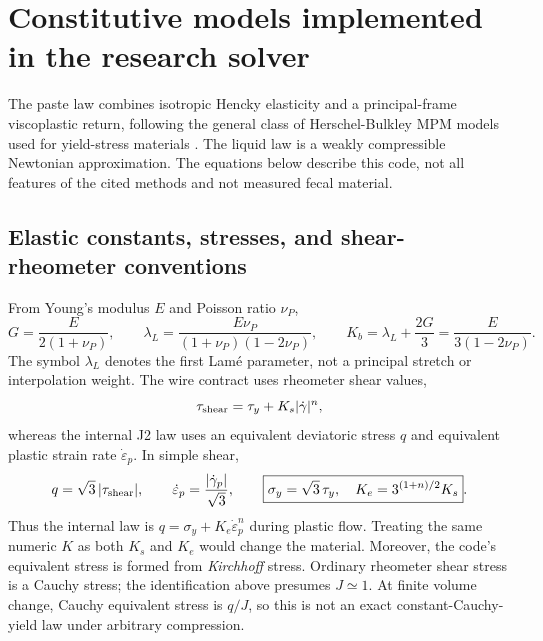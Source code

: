 \section{Constitutive models implemented in the research solver}
\label{sec:constitutive}
The paste law combines isotropic Hencky elasticity and a principal-frame
viscoplastic return, following the general class of Herschel-Bulkley MPM models
used for yield-stress materials \cite{foam}. The liquid law is a weakly
compressible Newtonian approximation. The equations below describe this code,
not all features of the cited methods and not measured fecal material.

\subsection{Elastic constants, stresses, and shear-rheometer conventions}
From Young's modulus $E$ and Poisson ratio $\nu_P$,
\begin{equation}
 G=\frac{E}{2(1+\nu_P)},\qquad
 \lambda_L=\frac{E\nu_P}{(1+\nu_P)(1-2\nu_P)},\qquad
 K_b=\lambda_L+\frac{2G}{3}=\frac{E}{3(1-2\nu_P)}.
 \label{eq:moduli}
\end{equation}
The symbol $\lambda_L$ denotes the first Lam\'e parameter, not a principal
stretch or interpolation weight. The wire contract uses rheometer shear values,
\begin{equation}
 \tau_{\rm shear}=\tau_y+K_s|\dot\gamma|^n,
\end{equation}
whereas the internal J2 law uses an equivalent deviatoric stress $q$ and
equivalent plastic strain rate $\dot\varepsilon_p$. In simple shear,
\begin{equation}
 q=\sqrt{3}\,|\tau_{\rm shear}|,\qquad
 \dot\varepsilon_p=\frac{|\dot\gamma_p|}{\sqrt{3}},\qquad
 \boxed{\sigma_y=\sqrt{3}\,\tau_y,\quad K_e=3^{(1+n)/2}K_s}.
 \label{eq:shear-conversion}
\end{equation}
Thus the internal law is $q=\sigma_y+K_e\dot\varepsilon_p^n$ during plastic
flow. Treating the same numeric $K$ as both $K_s$ and $K_e$ would change the
material. Moreover, the code's equivalent stress is formed from
\emph{Kirchhoff} stress. Ordinary rheometer shear stress is a Cauchy stress;
the identification above presumes $J\simeq1$. At finite volume change, Cauchy
equivalent stress is $q/J$, so this is not an exact constant-Cauchy-yield law
under arbitrary compression.

